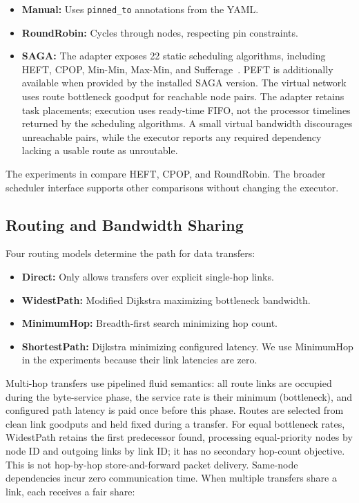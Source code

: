 \documentclass[conference]{IEEEtran}
\begin{document}
\begin{itemize}[itemsep=1pt,leftmargin=*]
\item \textbf{Manual:} Uses \texttt{pinned\_to} annotations from the YAML.
\item \textbf{RoundRobin:} Cycles through nodes, respecting pin constraints.
\item \textbf{SAGA:} The adapter exposes 22 static scheduling algorithms,
  including HEFT, CPOP, Min-Min, Max-Min, and Sufferage~\cite{heft,SAGARepo}.
  PEFT is additionally available when provided by the installed SAGA version.
  The virtual network uses route bottleneck goodput for reachable node pairs.
  The adapter retains task placements; execution uses ready-time FIFO,
  not the processor timelines returned by the scheduling algorithms.
  A small virtual bandwidth discourages unreachable pairs, while the executor
  reports any required dependency lacking a usable route as unroutable.
\end{itemize}
\noindent The experiments in  compare HEFT, CPOP, and
RoundRobin. The broader scheduler interface supports other comparisons
without changing the executor.

\subsection{Routing and Bandwidth Sharing}

Four routing models determine the path for data transfers:

\begin{itemize}[itemsep=1pt,leftmargin=*]
\item \textbf{Direct:} Only allows transfers over explicit single-hop links.
\item \textbf{WidestPath:} Modified Dijkstra maximizing bottleneck bandwidth.
\item \textbf{MinimumHop:} Breadth-first search minimizing hop count.
\item \textbf{ShortestPath:} Dijkstra minimizing configured latency.
  We use MinimumHop in the experiments because their link latencies are zero.
\end{itemize}

Multi-hop transfers use pipelined fluid semantics: all route links are
occupied during the byte-service phase, the service rate is their minimum
(bottleneck), and configured path latency is paid once before this phase.
Routes are selected from clean link goodputs and held fixed during a transfer.
For equal bottleneck rates, WidestPath retains the first predecessor found,
processing equal-priority nodes by node ID and outgoing links by link ID;
it has no secondary hop-count objective.
This is not hop-by-hop store-and-forward packet delivery. Same-node
dependencies incur zero communication time. When multiple transfers share
a link, each receives a fair share:
\end{document}
